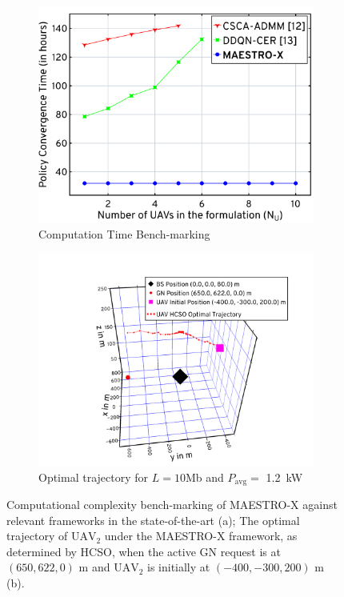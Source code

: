 \documentclass[12pt, draftcls, onecolumn]{IEEEtran}
\theoremstyle{plain}
\theoremstyle{definition}
\theoremstyle{remark}
\begin{document}
\begin{figure}[t]
	\begin{subfigure}{0.493\linewidth}
  		\centering
  		\includegraphics[width=0.9\linewidth]{figs/Computational_Complexity.png}
  		\caption{Computation Time Bench-marking}
  		\label{F6}
	\end{subfigure}
	\begin{subfigure}{0.507\linewidth}
  		\centering
  		\includegraphics[width=0.9\linewidth]{figs/Optimal_UAV_Trajectory.png}
		\caption{Optimal trajectory for $L{=}10$Mb and $P_{\mathrm{avg}}=$ \qty[mode=text]{1.2}{\kilo\watt}}
		\label{F7}
	\end{subfigure}
	\caption{Computational complexity bench-marking of MAESTRO-X against relevant frameworks in the state-of-the-art (a); The optimal trajectory of $\text{UAV}_{2}$ under the MAESTRO-X framework, as determined by HCSO, when the active GN request is at $(650,622,0)$ m and $\text{UAV}_{2}$ is initially at $(-400,-300,200)$ m (b).}
	\vspace{-10mm}
	\label{fig:F6andF7}
\end{figure}
\end{document}
